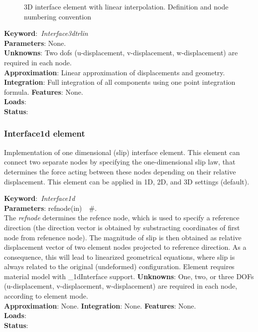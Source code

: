 \documentclass[12pt,dvips]{article}
\newcommand{\descitem}[1]{{\noindent \bf #1}:}
\newcommand{\elemkeyword}[1]{\descitem{Keyword}~{\em #1}}
\newcommand{\elemparam}[2]{{{#1\tiny (#2)}~~\#}}
\newcommand{\param}[1]{{\it #1}}
\begin{document}
\begin{figure}[tb]
\begin{center}\end{center}
\caption{3D interface element with linear interpolation. Definition and node numbering convention}
\label{interf3d_lin_fig}
\end{figure}

\elemkeyword{Interface3dtrlin}\\
\descitem{Parameters} None.\\
\descitem{Unknowns}
Two dofs (u-displacement, v-displacement, w-displacement) are required in each node.\\
\descitem{Approximation} Linear approximation of displacements and
geometry.
\descitem{Integration}
Full integration of all components using one point integration formula.
\descitem{Features} None.\\
\descitem{Loads} \\
\descitem{Status} 


\subsubsection{Interface1d element}
Implementation of one dimensional (slip) interface element. 
This element can connect two separate nodes by specifying the
one-dimensional slip law, that determines the force acting between
these nodes depending on their relative displacement. This element can
be applied in 1D, 2D, and 3D settings (default).

\elemkeyword{Interface1d}\\
\descitem{Parameters} \elemparam{refnode}{in}.\\
The \param{refnode} determines the refence node, which is used to
specify a reference direction (the direction vector is obtained by
substracting coordinates of first node from refenence node).
The magnitude of slip is then obtained as relative displacement vector
of two element nodes projected to reference direction. As a
consequence, this will lead to linearized geometrical equations, where
slip is always related to the original (undeformed) configuration.
Element requires material model with \_1dInterface support.
\descitem{Unknowns}
One, two, or three DOFs (u-displacement, v-displacement,
w-displacement) are required in each node, according to element mode.\\
\descitem{Approximation} None.
\descitem{Integration} None.
\descitem{Features} None.\\
\descitem{Loads} \\
\descitem{Status} 
\end{document}
